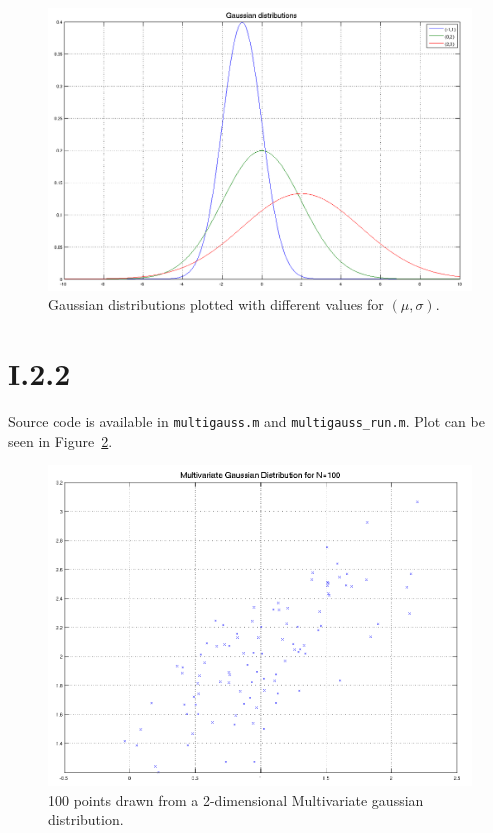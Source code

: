\begin{figure}[h!]
	\includegraphics[width=\textwidth]{img/unigauss}
	\caption{Gaussian distributions plotted with different values for
          $(\mu, \sigma)$. \label{fig:I.2.1}}
\end{figure}

\section*{I.2.2}
Source code is available in \texttt{multigauss.m} and \texttt{multigauss\_run.m}.
Plot can be seen in Figure~\ref{fig:I.2.2}.
\begin{figure}[h!]
	\includegraphics[width=\textwidth]{img/multigauss}
	\caption{100 points drawn from a 2-dimensional Multivariate gaussian
          distribution. \label{fig:I.2.2}}
\end{figure}

